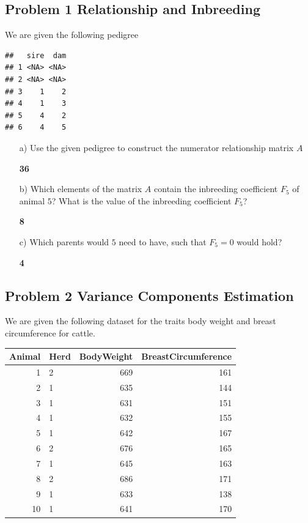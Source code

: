 \documentclass[]{article}
\newcommand{\points}[1]
{\begin{flushright}\textbf{#1}\end{flushright}}
\begin{document}
\clearpage
\pagebreak

\subsection{Problem 1 Relationship and
Inbreeding}\label{problem-1-relationship-and-inbreeding}

We are given the following pedigree

\begin{verbatim}
##   sire  dam
## 1 <NA> <NA>
## 2 <NA> <NA>
## 3    1    2
## 4    1    3
## 5    4    2
## 6    4    5
\end{verbatim}

\begin{enumerate}
\item[a)] Use the given pedigree to construct the numerator relationship matrix $A$
\points{36}
\end{enumerate}

\clearpage
\pagebreak

\begin{enumerate}
\item[b)] Which elements of the matrix $A$ contain the inbreeding coefficient $F_5$ of animal $5$? What is the value of the inbreeding coefficient $F_5$?
\points{8}
\end{enumerate}

\clearpage
\pagebreak

\begin{enumerate}
\item[c)] Which parents would $5$ need to have, such that $F_5 = 0$ would hold?
\points{4}
\end{enumerate}

\clearpage
\pagebreak

\subsection{Problem 2 Variance Components
Estimation}\label{problem-2-variance-components-estimation}

We are given the following dataset for the traits body weight and breast
circumference for cattle.

\begin{longtable}[]{@{}rlrr@{}}
\toprule
Animal & Herd & BodyWeight & BreastCircumference\tabularnewline
\midrule
\endhead
1 & 2 & 669 & 161\tabularnewline
2 & 1 & 635 & 144\tabularnewline
3 & 1 & 631 & 151\tabularnewline
4 & 1 & 632 & 155\tabularnewline
5 & 1 & 642 & 167\tabularnewline
6 & 2 & 676 & 165\tabularnewline
7 & 1 & 645 & 163\tabularnewline
8 & 2 & 686 & 171\tabularnewline
9 & 1 & 633 & 138\tabularnewline
10 & 1 & 641 & 170\tabularnewline
\bottomrule
\end{longtable}
\end{document}

